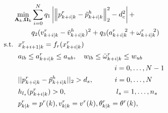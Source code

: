 \documentclass[journal]{IEEEtran}
\begin{document}
\begin{subequations}\label{eqn:path_plan_mpc}
\begin{align}
&\min_{\mathbf{A}_k,\mathbf{\Omega}_k}\sum\limits_{i=0}^{N} q_1\left| \left\|p^r_{k+i|k}-\tilde{p}^h_{k+i|k}\right\|^2_2-d^2_{c}\right| + \notag\\
 			&\hspace{9mm} q_2(v^r_{k+i|k}-\tilde{v}^h_{k+i|k})^2+
q_3(a^{r~~~~2}_{k+i|k}+\omega^{r~~~~2}_{k+i|k})\label{eqn:obj}\\
\text{s.t.}&~~x^r_{k+i+1|k}=f_r(x^r_{k+i|k})\label{eqn:robot_dyn}\\
&~~a_{lb}\le a^r_{k+i|k}\le a_{ub},~~~ w_{lb}\le \bar{\omega}^r_{k+i|k}\le w_{ub}\label{eqn:constr:w}\\
& \hspace{48mm}~~i=0,\dots,N-1\notag\\
			&~~||p^r_{k+i|k}-\tilde{p}^h_{k+i|k}||_2> d_s, ~~~~\hspace{6mm}i=0,\dots,N\label{eqn:constr:safety_human}\\
			&~~h_{l_s}(p^r_{k+i|k})> 0, ~~~~\hspace{20mm}l_s=1,\dots,n_s\label{eqn:constr:safety_s_obs1}\\
			&~~p^r_{k|k}=p^r(k),v^r_{k|k}=v^r(k),\theta^r_{k|k}=\theta^r(k)\label{eqn:constr:init},
		\end{align}
	\end{subequations}        
\end{document}
